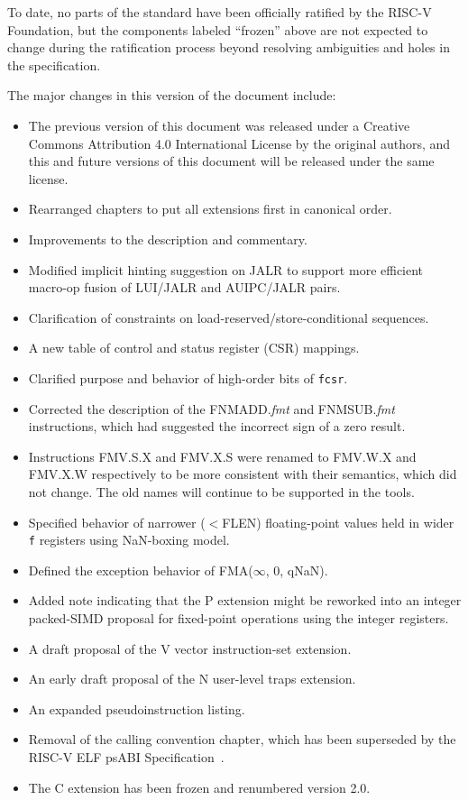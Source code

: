 To date, no parts of the standard have been officially ratified by the
RISC-V Foundation, but the components labeled ``frozen'' above are not
expected to change during the ratification process beyond resolving
ambiguities and holes in the specification.

The major changes in this version of the document include:
\begin{itemize}
\parskip 0pt
\itemsep 1pt
\item The previous version of this document was released under a
  Creative Commons Attribution 4.0 International License by the
  original authors, and this and future versions of this document will
  be released under the same license.
\item Rearranged chapters to put all extensions first in canonical order.
\item Improvements to the description and commentary.
\item Modified implicit hinting suggestion on JALR to support more efficient
  macro-op fusion of LUI/JALR and AUIPC/JALR pairs.
\item Clarification of constraints on load-reserved/store-conditional sequences.
\item A new table of control and status register (CSR) mappings.
\item Clarified purpose and behavior of high-order bits of {\tt fcsr}.
\item Corrected the description of the FNMADD.{\em fmt} and FNMSUB.{\em fmt}
      instructions, which had suggested the incorrect sign of a zero result.
\item Instructions FMV.S.X and FMV.X.S were renamed to FMV.W.X and
  FMV.X.W respectively to be more consistent with their
  semantics, which did not change.
  The old names will continue to be supported in the tools.
\item Specified behavior of narrower ($<$FLEN) floating-point values held in
  wider {\tt f} registers using NaN-boxing model.
\item Defined the exception behavior of FMA($\infty$, 0, qNaN).
\item Added note indicating that the P extension might be reworked
  into an integer packed-SIMD proposal for fixed-point operations
  using the integer registers.
\item A draft proposal of the V vector instruction-set extension.
\item An early draft proposal of the N user-level traps extension.
\item An expanded pseudoinstruction listing.
\item Removal of the calling convention chapter, which has been superseded by
      the RISC-V ELF psABI Specification~\cite{riscv-elf-psabi}.
\item The C extension has been frozen and renumbered version 2.0.
\end{itemize}

